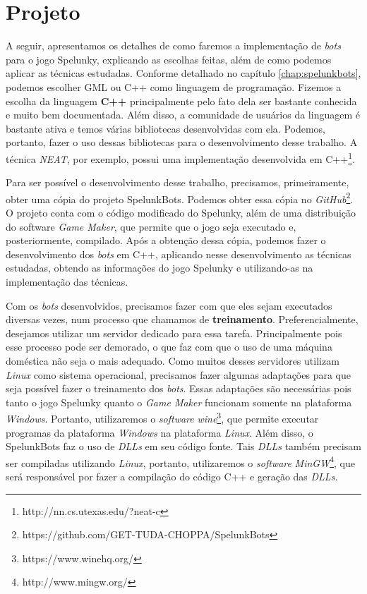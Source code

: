 \chapter{\label{chap:project}Projeto}

A seguir, apresentamos os detalhes de como faremos a implementação de
\textit{bots} para o jogo Spelunky, explicando as escolhas feitas, além de como
podemos aplicar as técnicas estudadas. Conforme detalhado no capítulo
\ref{chap:spelunkbots}, podemos escolher GML ou C++ como linguagem de
programação. Fizemos a escolha da linguagem \textbf{C++} principalmente pelo
fato dela ser bastante conhecida e muito bem documentada. Além disso, a
comunidade de usuários da linguagem é bastante ativa e temos várias bibliotecas
desenvolvidas com ela. Podemos, portanto, fazer o uso dessas bibliotecas para o
desenvolvimento desse trabalho. A técnica \textit{NEAT}, por exemplo, possui uma
implementação desenvolvida em C++\footnote{http://nn.cs.utexas.edu/?neat-c}.

Para ser possível o desenvolvimento desse trabalho, precisamos, primeiramente,
obter uma cópia do projeto SpelunkBots. Podemos obter essa cópia no
\textit{GitHub}\footnote{https://github.com/GET-TUDA-CHOPPA/SpelunkBots}. O
projeto conta com o código modificado do Spelunky, além de uma distribuição do
software \textit{Game Maker}, que permite que o jogo seja executado e,
posteriormente, compilado. Após a obtenção dessa cópia, podemos fazer o
desenvolvimento dos \textit{bots} em C++, aplicando nesse desenvolvimento as
técnicas estudadas, obtendo as informações do jogo Spelunky e utilizando-as
na implementação das técnicas.

Com os \textit{bots} desenvolvidos, precisamos fazer com que eles sejam
executados diversas vezes, num processo que chamamos de \textbf{treinamento}.
Preferencialmente, desejamos utilizar um servidor dedicado para essa tarefa.
Principalmente pois esse processo pode ser demorado, o que faz com que o uso de
uma máquina doméstica não seja o mais adequado. Como muitos desses servidores
utilizam \textit{Linux} como sistema operacional, precisamos fazer algumas
adaptações para que seja possível fazer o treinamento dos \textit{bots}. Essas
adaptações são necessárias pois tanto o jogo Spelunky quanto o \textit{Game
Maker} funcionam somente na plataforma \textit{Windows}.
Portanto, utilizaremos o \textit{software}
\textit{wine}\footnote{https://www.winehq.org/}, que permite executar programas
da plataforma \textit{Windows} na plataforma \textit{Linux}. Além disso, o
SpelunkBots faz o uso de \textit{DLLs} em seu código fonte. Tais \textit{DLLs}
também precisam ser compiladas utilizando \textit{Linux}, portanto,
utilizaremos o \textit{software}
\textit{MinGW}\footnote{http://www.mingw.org/}, que será responsável por fazer
a compilação do código C++ e geração das \textit{DLLs}.

